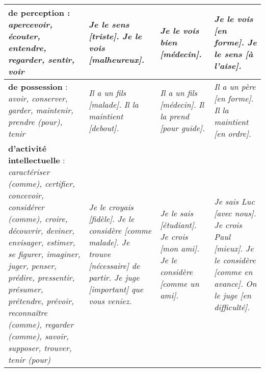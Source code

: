 \documentclass[UTF8]{report}
\begin{document}
\begin{tabular}{|p{4cm}|p{3.5cm}|p{3.5cm}|>{\RaggedRight\arraybackslash}p{3.5cm}|}
\hline
\textbf{de perception} : \newline \textit{apercevoir, écouter, entendre, \newline regarder, sentir, voir} & \textit{Je le sens [triste].} \newline \textit{Je le vois [malheureux].} & \textit{Je le vois bien [médecin].} & \textit{Je le vois [en forme].} \newline \textit{Je le sens [à l'aise].} \\
\hline
\textbf{de possession} : \newline \textit{avoir, conserver, garder, \newline maintenir, prendre (pour), tenir} & \textit{Il a un fils [malade].} \newline \textit{Il la maintient [debout].} & \textit{Il a un fils [médecin].} \newline \textit{Il la prend [pour guide].} & \textit{Il a un père [en forme].} \newline \textit{Il la maintient [en ordre].} \\
\hline
\textbf{d'activité intellectuelle} : \newline \textit{caractériser (comme), \newline certifier, concevoir, \newline considérer (comme), \newline croire, découvrir, deviner, \newline envisager, estimer, \newline se figurer, imaginer, juger, \newline penser, prédire, pressentir, \newline présumer, prétendre, prévoir, \newline reconnaître (comme), \newline regarder (comme), savoir, \newline supposer, trouver, tenir (pour)} & \textit{Je le croyais [fidèle].} \newline \textit{Je le considère [comme malade].} \newline \textit{Je trouve [nécessaire] de partir.} \newline \textit{Je juge [important] que vous veniez.} & \textit{Je le sais [étudiant].} \newline \textit{Je crois [mon ami].} \newline \textit{Je le considère [comme un ami].} & \textit{Je sais Luc [avec nous].} \newline \textit{Je crois Paul [mieux].} \newline \textit{Je le considère [comme en avance].} \newline \textit{On le juge [en difficulté].} \\

\end{tabular}
\end{document}
